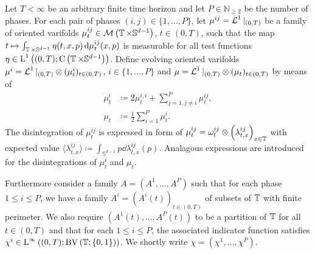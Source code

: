 \begin{definition}
	\label{de_giorgi_varifold_solutions_for_mmcf}
	Let $T < \infty $ be an arbitrary finite time horizon and let $ P \in 
	\mathbb{ N }_{ \geq 2 } $ be the number of phases. For each 
	pair of phases $ ( i , j ) \in \{ 1 , \dotsc, P \} $, let 
	$ \mu^{ i j } = \operatorname{\mathcal{L}}^{ 1 }|_{ ( 0 , T ) } $ be a family of oriented 
	varifolds 
	$ \mu_{ t }^{ i j } \in \mathcal{ M } \left(
		\operatorname{\mathbb{T}} \times \mathbb{ S }^{ d - 1 }
	\right) $,
	$ t \in ( 0 , T ) $, such that the map 
	$ t \mapsto \int_{ \operatorname{\mathbb{T}} \times \mathbb{ S }^{ d - 1 } }
		\eta ( t , x , p )
	\dd{ \mu_{ t }^{ i j } ( x, p ) }$
	is measurable for all test functions 
	$ \eta \in \operatorname{L}^{ 1 } \left(	
		( 0 , T ) ; \operatorname{C} \left( \operatorname{\mathbb{T}} \times \mathbb{ S }^{ d- 1 } 
		\right) 
	\right) $.
	Define evolving oriented varifolds $ \mu^{ i } = \operatorname{\mathcal{L}}^{ 1 }|_{ ( 0 , T 
	) } \otimes ( \mu_{ t }^{ i } )_{ t \in ( 0 , T ) } $, $ i \in \{ 1, 
	\dotsc, P \} $ and $ \mu = \operatorname{\mathcal{L}}^{ 1 }|_{ ( 0 , T ) } \otimes ( \mu_{ t 
	} )_{ t \in ( 0 , T ) } $ by means of
	\begin{align*}
		\mu_{ t }^{ i }
		& \coloneqq
		2 \mu_{ t }^{ i , i }
		+
		\sum_{ j = 1 , j \neq i }^{ P }
			\mu_{ t }^{ i j },
		\\
		\mu_{ t }
		& \coloneqq
		\frac{ 1 }{ 2 }
		\sum_{ i = 1 }^{ P }
			\mu_{ t }^{ i }.
	\end{align*}
	The disintegration of $ \mu_{ t }^{ i j } $ is expressed in form of 
	$ \mu_{ t }^{ i j } = \omega_{ t }^{ i j } \otimes \left( \lambda _{ t , x 
	}^{ i j } \right)_{ x \in \operatorname{\mathbb{T}} } $ with expected value
	$ \langle \lambda_{ t , x }^{ i j } \rangle 
	\coloneqq
	\int_{ \mathbb{ S }^{ d - 1 } }
		p 
	\dd{ \lambda_{ t , x }^{ i j } ( p ) } $.
	Analagous expressions are introduced for the disintegrations of $ \mu_{ t 
	}^{ i } $ and $ \mu_{ t } $.
	
	Furthermore consider a family 
	$ A = \left( A^{ 1 } , \dotsc , A^{ P } \right) $ 
	such that for each phase $ 1 \leq i \leq P $, we have a family
	$ A^{ i } = ( A^{ i } ( t ) )_{ t \in ( 0 , T ) } $ of subsets of $ 
	\operatorname{\mathbb{T}} $ with finite perimeter. We also require 
	$ \left( A^{ 1 } ( t ) , \dotsc, A^{ P } ( t ) \right) $
	to be a partition of $ \operatorname{\mathbb{T}} $ for all $ t \in ( 0 , T ) $ and 
	that for each $ 1 \leq i \leq P $, the associated indicator function 
	satisfies 
	$ \chi^{ i } \in \operatorname{L}^{ \infty } \left(
		( 0 , T ) ;
		\operatorname{BV} \left( \operatorname{\mathbb{T}} ; \{ 0 , 1 \} \right)
	\right) $.
	We shortly write $ \chi = \left( \chi^{ 1 } , \dotsc, \chi^{ P } \right) $.
	

\end{definition}
